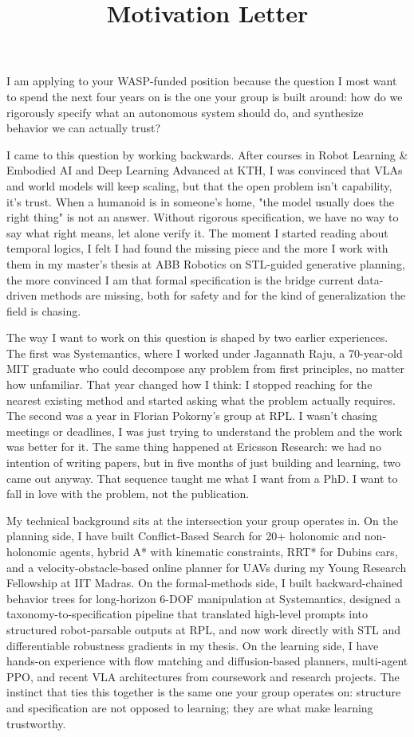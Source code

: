 \documentclass{article}
\title{Motivation Letter}
\begin{document}
  \maketitle
\vspace{7pt}


I am applying to your WASP-funded position because the question I most want to spend the next four years on is the one your group is built around: how do we rigorously specify what an autonomous system should do, and synthesize behavior we can actually trust?

I came to this question by working backwards. After courses in Robot Learning \& Embodied AI and Deep Learning Advanced at KTH, I was convinced that VLAs and world models will keep scaling, but that the open problem isn't capability, it's trust. When a humanoid is in someone's home, "the model usually does the right thing" is not an answer. Without rigorous specification, we have no way to say what right means, let alone verify it. The moment I started reading about temporal logics, I felt I had found the missing piece and the more I work with them in my master's thesis at ABB Robotics on STL-guided generative planning, the more convinced I am that formal specification is the bridge current data-driven methods are missing, both for safety and for the kind of generalization the field is chasing.

The way I want to work on this question is shaped by two earlier experiences. The first was Systemantics, where I worked under Jagannath Raju, a 70-year-old MIT graduate who could decompose any problem from first principles, no matter how unfamiliar. That year changed how I think: I stopped reaching for the nearest existing method and started asking what the problem actually requires. The second was a year in Florian Pokorny's group at RPL. I wasn't chasing meetings or deadlines, I was just trying to understand the problem and the work was better for it. The same thing happened at Ericsson Research: we had no intention of writing papers, but in five months of just building and learning, two came out anyway. That sequence taught me what I want from a PhD. I want to fall in love with the problem, not the publication.

My technical background sits at the intersection your group operates in. On the planning side, I have built Conflict-Based Search for 20+ holonomic and non-holonomic agents, hybrid A* with kinematic constraints, RRT* for Dubins cars, and a velocity-obstacle-based online planner for UAVs during my Young Research Fellowship at IIT Madras. On the formal-methods side, I built backward-chained behavior trees for long-horizon 6-DOF manipulation at Systemantics, designed a taxonomy-to-specification pipeline that translated high-level prompts into structured robot-parsable outputs at RPL, and now work directly with STL and differentiable robustness gradients in my thesis. On the learning side, I have hands-on experience with flow matching and diffusion-based planners, multi-agent PPO, and recent VLA architectures from coursework and research projects. The instinct that ties this together is the same one your group operates on: structure and specification are not opposed to learning; they are what make learning trustworthy.
\end{document}
